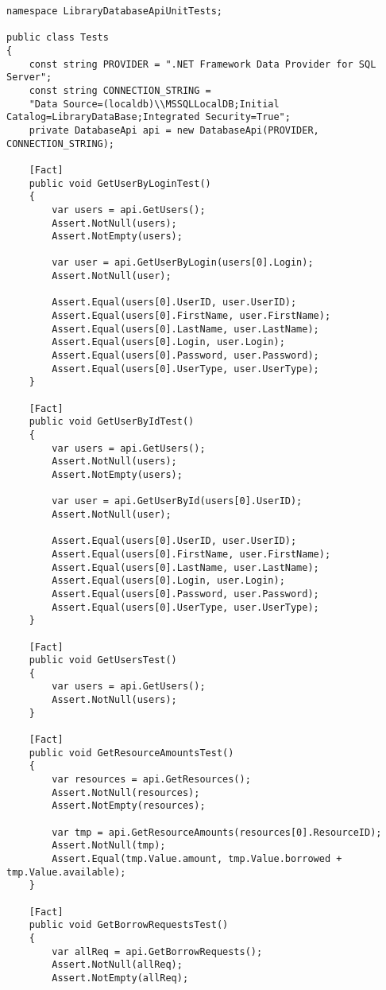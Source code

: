 \begin{verbatim}
namespace LibraryDatabaseApiUnitTests;

public class Tests
{
    const string PROVIDER = ".NET Framework Data Provider for SQL Server";
    const string CONNECTION_STRING = 
    "Data Source=(localdb)\\MSSQLLocalDB;Initial Catalog=LibraryDataBase;Integrated Security=True";
    private DatabaseApi api = new DatabaseApi(PROVIDER, CONNECTION_STRING);

    [Fact]
    public void GetUserByLoginTest()
    {
        var users = api.GetUsers();
        Assert.NotNull(users);
        Assert.NotEmpty(users);

        var user = api.GetUserByLogin(users[0].Login);
        Assert.NotNull(user);

        Assert.Equal(users[0].UserID, user.UserID);
        Assert.Equal(users[0].FirstName, user.FirstName);
        Assert.Equal(users[0].LastName, user.LastName);
        Assert.Equal(users[0].Login, user.Login);
        Assert.Equal(users[0].Password, user.Password);
        Assert.Equal(users[0].UserType, user.UserType);
    }

    [Fact]
    public void GetUserByIdTest()
    {
        var users = api.GetUsers();
        Assert.NotNull(users);
        Assert.NotEmpty(users);

        var user = api.GetUserById(users[0].UserID);
        Assert.NotNull(user);

        Assert.Equal(users[0].UserID, user.UserID);
        Assert.Equal(users[0].FirstName, user.FirstName);
        Assert.Equal(users[0].LastName, user.LastName);
        Assert.Equal(users[0].Login, user.Login);
        Assert.Equal(users[0].Password, user.Password);
        Assert.Equal(users[0].UserType, user.UserType);
    }

    [Fact]
    public void GetUsersTest()
    {
        var users = api.GetUsers();
        Assert.NotNull(users);
    }

    [Fact]
    public void GetResourceAmountsTest()
    {
        var resources = api.GetResources();
        Assert.NotNull(resources);
        Assert.NotEmpty(resources);

        var tmp = api.GetResourceAmounts(resources[0].ResourceID);
        Assert.NotNull(tmp);
        Assert.Equal(tmp.Value.amount, tmp.Value.borrowed + tmp.Value.available);
    }

    [Fact]
    public void GetBorrowRequestsTest()
    {
        var allReq = api.GetBorrowRequests();
        Assert.NotNull(allReq);
        Assert.NotEmpty(allReq);


\end{verbatim}
